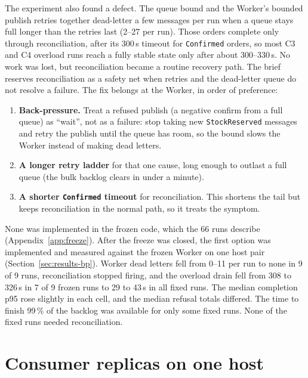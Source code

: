 \documentclass[a4paper]{report}
\begin{document}
The experiment also found a defect. The queue bound and the Worker's
bounded publish retries together dead-letter a few messages per run when a
queue stays full longer than the retries last (2--27 per run). Those orders
complete only through reconciliation, after its 300\,s timeout for
\texttt{Confirmed} orders, so most C3 and C4 overload runs reach a fully
stable state only after about 300--330\,s. No work was lost, but
reconciliation became a routine recovery path. The brief reserves
reconciliation as a safety net when retries and the dead-letter queue do not
resolve a failure. The fix belongs at the Worker, in order of preference:
\begin{enumerate}
  \item \textbf{Back-pressure.} Treat a refused publish (a negative confirm
    from a full queue) as ``wait'', not as a failure: stop taking new
    \texttt{StockReserved} messages and retry the publish until the queue has
    room, so the bound slows the Worker instead of making dead letters.
  \item \textbf{A longer retry ladder} for that one cause, long enough to
    outlast a full queue (the bulk backlog clears in under a minute).
  \item \textbf{A shorter \texttt{Confirmed} timeout} for reconciliation. This
    shortens the tail but keeps reconciliation in the normal path, so it
    treats the symptom.
\end{enumerate}
None was implemented in the frozen code, which the 66 runs describe
(Appendix~\ref{app:freeze}). After the freeze was closed, the first option was
implemented and measured against the frozen Worker on one host pair
(Section~\ref{sec:results-bp}). Worker dead letters fell from 0--11 per run to
none in 9 of 9 runs, reconciliation stopped firing, and the overload drain fell
from 308 to 326\,s in 7 of 9 frozen runs to 29 to 43\,s in all fixed runs.
The median completion p95 rose slightly in each cell, and the median refusal
totals differed. The time to finish 99\,\% of the backlog was available for
only some fixed runs. None of the fixed runs needed reconciliation.

\section{Consumer replicas on one host}
\end{document}
